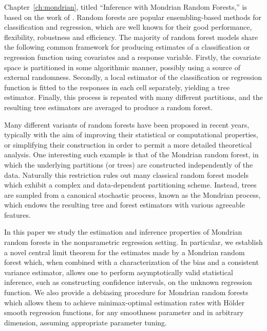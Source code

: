 Chapter~\ref{ch:mondrian}, titled ``Inference with Mondrian Random Forests,''
is based on the work of \cite{cattaneo2023inference}.
Random forests are popular ensembling-based methods for classification and
regression, which are well known for their good performance, flexibility,
robustness and efficiency. The majority of random forest models share the
following common framework for producing estimates of a classification or
regression function using covariates and a response variable. Firstly, the
covariate space is partitioned in some algorithmic manner, possibly using a
source of external randomness. Secondly, a local estimator of the
classification or regression function is fitted to the responses in each cell
separately, yielding a tree estimator. Finally, this process
is repeated with many different partitions, and the resulting tree estimators
are averaged to produce a random forest.

Many different variants of random forests have been proposed in recent years,
typically with the aim of improving their statistical or computational
properties, or simplifying their construction in order to permit a more
detailed theoretical analysis.
One interesting such example is that of the Mondrian random forest, in which
the underlying partitions (or trees) are constructed independently of the data.
Naturally this restriction rules out many classical random forest models which
exhibit a complex and data-dependent partitioning scheme. Instead, trees are
sampled from a canonical stochastic process, known as the Mondrian process,
which endows the resulting tree and forest estimators with various agreeable
features.

In this paper we study the estimation and inference properties of Mondrian
random forests in the nonparametric regression setting. In particular, we
establish a novel central limit theorem for the estimates made by a Mondrian
random forest which, when combined with a characterization of the bias and a
consistent variance estimator, allows one to perform asymptotically valid
statistical inference, such as constructing confidence intervals, on the
unknown regression function. We also provide a debiasing procedure for Mondrian
random forests which allows them to achieve minimax-optimal estimation rates
with H{\"o}lder smooth regression functions, for any smoothness parameter and
in arbitrary dimension, assuming appropriate parameter tuning.

